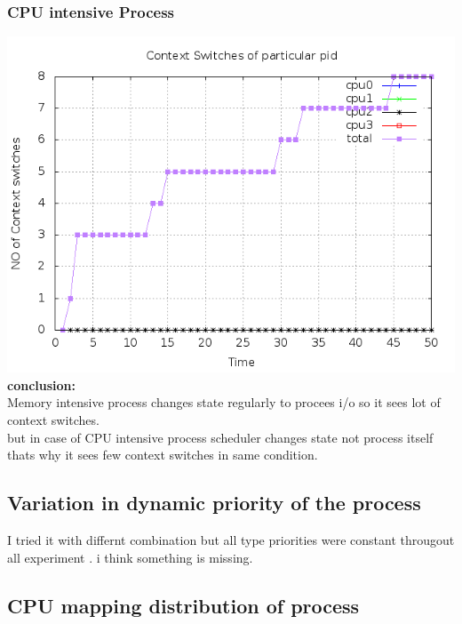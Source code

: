 \documentclass[a4paper,11pt]{report}
\begin{document}
 \subsubsection{CPU intensive Process}
 \includegraphics[scale=0.5]{pidcpucs.png}\\
 {\bf conclusion:}\\ Memory intensive process changes state regularly to procees i/o so it sees lot of context switches.\\
 but in case of CPU intensive process scheduler changes state not process itself thats why it sees few context switches in same condition. 
 
 \subsection{Variation in dynamic priority of the process}
 I tried it with differnt combination but all type priorities were constant througout all experiment . i think something is missing.
 \subsection{CPU mapping distribution of process}
\end{document}
